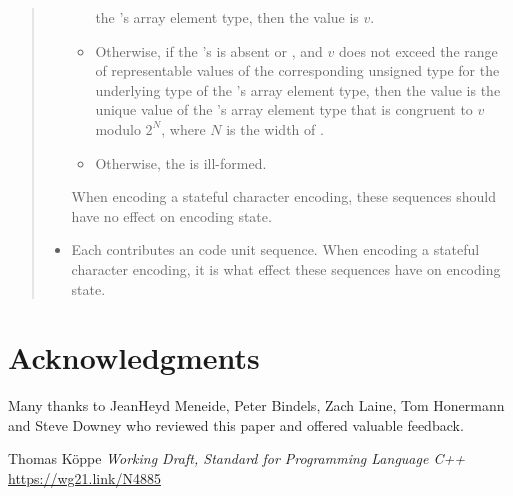 \documentclass{wg21}
\begin{document}
\begin{quote}
\begin{itemize}
\begin{itemize}
        the 's array element type,
        then the value is $v$.
        \item
        Otherwise,
        if the 's 
        is absent or , and
        $v$ does not exceed the range of representable values of
        the corresponding unsigned type for the underlying type of
        the 's array element type,
        then the value is the unique value of
        the 's array element type 
        that is congruent to $v$ modulo $2^N$, where $N$ is the width of .
        \item
        Otherwise, the  is ill-formed.
    \end{itemize}
    When encoding a stateful character encoding,
    these sequences should have no effect on encoding state.
    \item
    Each 
    contributes an
    code unit sequence.
    When encoding a stateful character encoding,
    it is
    what effect these sequences have on encoding state.
\end{itemize}




\end{quote}

\section{Acknowledgments}

Many thanks to JeanHeyd Meneide, Peter Bindels, Zach Laine, Tom Honermann and Steve Downey who reviewed this paper and offered valuable feedback.






\renewcommand{\section}[2]{}%
\begin{thebibliography}{9}
    Thomas Köppe
    \emph{Working Draft, Standard for Programming Language C++}\newline
    \url{https://wg21.link/N4885}
\end{thebibliography}
\end{document}
